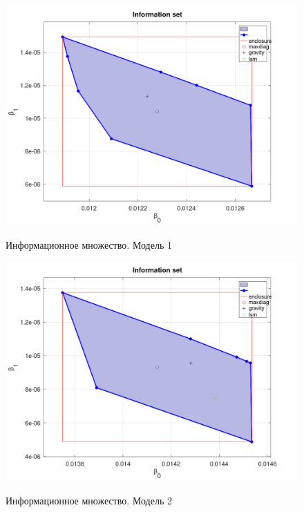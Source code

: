 \begin{figure}[H]
	\begin{center}
		\includegraphics[scale=0.32]{info_set_full_1}
		\label{pic:infoset1}
		\caption{Информационное множество. Модель 1}
	\end{center}
\end{figure}

\begin{figure}[H]
	\begin{center}
		\includegraphics[scale=0.32]{info_set_full_2}
		\label{pic:infoset2}
		\caption{Информационное множество. Модель 2}
	\end{center}
\end{figure}

